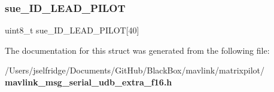 \subsubsection{sue\+\_\+\+I\+D\+\_\+\+L\+E\+A\+D\+\_\+\+P\+I\+L\+OT}
{\footnotesize\ttfamily uint8\+\_\+t sue\+\_\+\+I\+D\+\_\+\+L\+E\+A\+D\+\_\+\+P\+I\+L\+OT[40]}



The documentation for this struct was generated from the following file\+:\begin{DoxyCompactItemize}
\item 
/\+Users/jselfridge/\+Documents/\+Git\+Hub/\+Black\+Box/mavlink/matrixpilot/\textbf{ mavlink\+\_\+msg\+\_\+serial\+\_\+udb\+\_\+extra\+\_\+f16.\+h}\end{DoxyCompactItemize}
